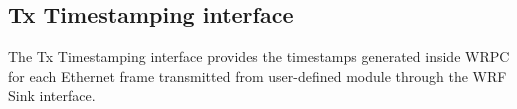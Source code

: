 \subsection{Tx Timestamping interface}
\label{sec:txts}


The Tx Timestamping interface provides the timestamps generated inside WRPC for each
Ethernet frame transmitted from user-defined module through the WRF Sink interface.\\

